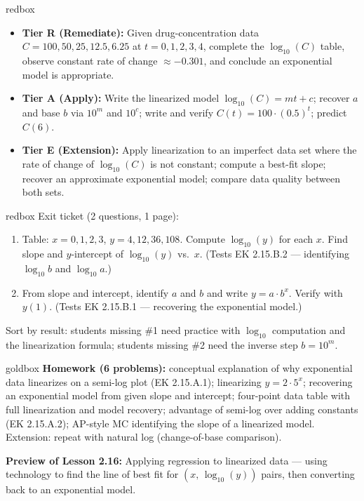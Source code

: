 \documentclass[10pt]{article}
\begin{document}
\begin{skillbox}{redbox}
\begin{itemize}[leftmargin=1.2em,itemsep=2pt,topsep=0pt]
  \item \textbf{Tier R (Remediate):} Given drug-concentration data $C = 100,50,25,12.5,6.25$
        at $t = 0,1,2,3,4$, complete the $\log_{10}(C)$ table, observe constant rate of
        change $\approx -0.301$, and conclude an exponential model is appropriate.
  \item \textbf{Tier A (Apply):} Write the linearized model $\log_{10}(C) = mt + c$; recover
        $a$ and base $b$ via $10^m$ and $10^c$; write and verify $C(t) = 100\cdot(0.5)^t$;
        predict $C(6)$.
  \item \textbf{Tier E (Extension):} Apply linearization to an imperfect data set where the
        rate of change of $\log_{10}(C)$ is not constant; compute a best-fit slope; recover
        an approximate exponential model; compare data quality between both sets.
\end{itemize}
\end{skillbox}

\begin{skillbox}{redbox}
Exit ticket (2 questions, 1 page):
\begin{enumerate}[leftmargin=1.5em,itemsep=2pt,topsep=2pt]
  \item Table: $x = 0,1,2,3$, $y = 4, 12, 36, 108$.  Compute $\log_{10}(y)$ for each $x$.
        Find slope and $y$-intercept of $\log_{10}(y)$ vs.\ $x$.
        (Tests EK 2.15.B.2 --- identifying $\log_{10} b$ and $\log_{10} a$.)
  \item From slope and intercept, identify $a$ and $b$ and write $y = a\cdot b^x$.
        Verify with $y(1)$.
        (Tests EK 2.15.B.1 --- recovering the exponential model.)
\end{enumerate}

Sort by result: students missing \#1 need practice with $\log_{10}$ computation and the
linearization formula; students missing \#2 need the inverse step $b = 10^m$.
\end{skillbox}

\begin{skillbox}{goldbox}
\textbf{Homework (6 problems):} conceptual explanation of why exponential data linearizes on
a semi-log plot (EK 2.15.A.1); linearizing $y = 2\cdot5^x$; recovering an exponential model
from given slope and intercept; four-point data table with full linearization and model
recovery; advantage of semi-log over adding constants (EK 2.15.A.2); AP-style MC identifying
the slope of a linearized model.  Extension: repeat with natural log (change-of-base
comparison).

\textbf{Preview of Lesson 2.16:} Applying regression to linearized data --- using technology
to find the line of best fit for $(x,\,\log_{10}(y))$ pairs, then converting back to an
exponential model.
\end{skillbox}
\end{document}
